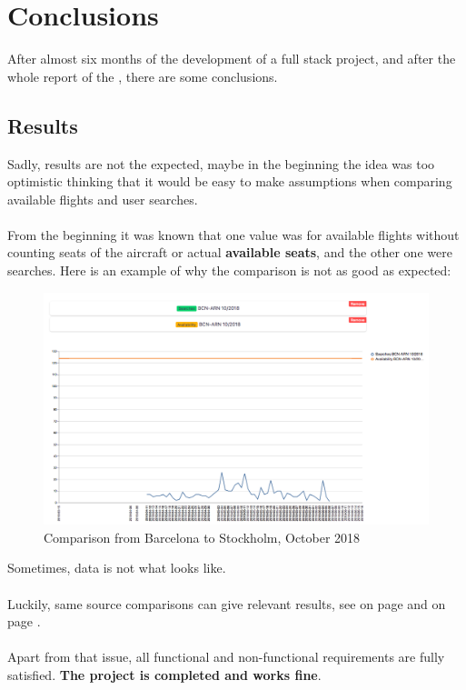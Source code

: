 
\chapter{Conclusions} \label{chapter11}

After almost six months of the development of a full stack project, and after the whole report of the \thesis, there are some conclusions.

\section{Results}

Sadly, results are not the expected, maybe in the beginning the idea was too optimistic thinking that it would be easy to make assumptions when comparing available flights and user searches.
\\\\
From the beginning it was known that one value was for available flights without counting seats of the aircraft or actual \textbf{available seats}, and the other one were searches. Here is an example of why the comparison is not as good as expected:

\begin{figure}[H]
\centering
\includegraphics[scale=0.3]{resources/experiment03.png}
\caption{Comparison from Barcelona to Stockholm, October 2018}
\end{figure}

Sometimes, data is not what looks like.
\\\\
Luckily, same source comparisons can give relevant results, see  on page \pageref{exp1} and  on page \pageref{exp2}.
\\\\
Apart from that issue, all functional and non-functional requirements are fully satisfied. \textbf{The project is completed and works fine}.

